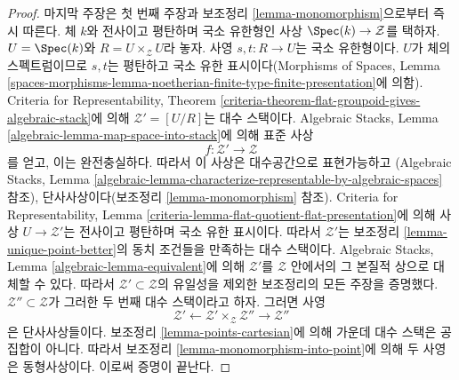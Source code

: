 \begin{proof}
마지막 주장은 첫 번째 주장과 보조정리 \ref{lemma-monomorphism}으로부터 즉시 따른다.
체 $k$와 전사이고 평탄하며 국소 유한형인 사상
$\Spec(k) \to \mathcal{Z}$를 택하자.
$U = \Spec(k)$와 $R = U \times_\mathcal{Z} U$라 놓자.
사영 $s, t : R \to U$는 국소 유한형이다. $U$가 체의 스펙트럼이므로
$s, t$는 평탄하고 국소 유한 표시이다(Morphisms of Spaces, Lemma
\ref{spaces-morphisms-lemma-noetherian-finite-type-finite-presentation}에 의함).
Criteria for Representability,
Theorem \ref{criteria-theorem-flat-groupoid-gives-algebraic-stack}에 의해
$\mathcal{Z}' = [U/R]$는 대수 스택이다.
Algebraic Stacks, Lemma \ref{algebraic-lemma-map-space-into-stack}에 의해
표준 사상
$$
f : \mathcal{Z}' \longrightarrow \mathcal{Z}
$$
를 얻고, 이는 완전충실하다. 따라서 이 사상은 대수공간으로 표현가능하고
(Algebraic Stacks, Lemma
\ref{algebraic-lemma-characterize-representable-by-algebraic-spaces} 참조),
단사사상이다(보조정리 \ref{lemma-monomorphism} 참조).
Criteria for Representability,
Lemma \ref{criteria-lemma-flat-quotient-flat-presentation}에 의해
사상 $U \to \mathcal{Z}'$는 전사이고 평탄하며 국소 유한 표시이다.
따라서 $\mathcal{Z}'$는 보조정리 \ref{lemma-unique-point-better}의
동치 조건들을 만족하는 대수 스택이다.
Algebraic Stacks, Lemma \ref{algebraic-lemma-equivalent}에 의해
$\mathcal{Z}'$를 $\mathcal{Z}$ 안에서의 그 본질적 상으로 대체할 수 있다.
따라서 $\mathcal{Z}' \subset \mathcal{Z}$의 유일성을 제외한
보조정리의 모든 주장을 증명했다. $\mathcal{Z}'' \subset \mathcal{Z}$가
그러한 두 번째 대수 스택이라고 하자.
그러면 사영
$$
\mathcal{Z}'
\longleftarrow
\mathcal{Z}' \times_\mathcal{Z} \mathcal{Z}''
\longrightarrow
\mathcal{Z}''
$$
은 단사사상들이다. 보조정리 \ref{lemma-points-cartesian}에 의해
가운데 대수 스택은 공집합이 아니다. 따라서 보조정리
\ref{lemma-monomorphism-into-point}에 의해 두 사영은 동형사상이다.
이로써 증명이 끝난다.
\end{proof}

